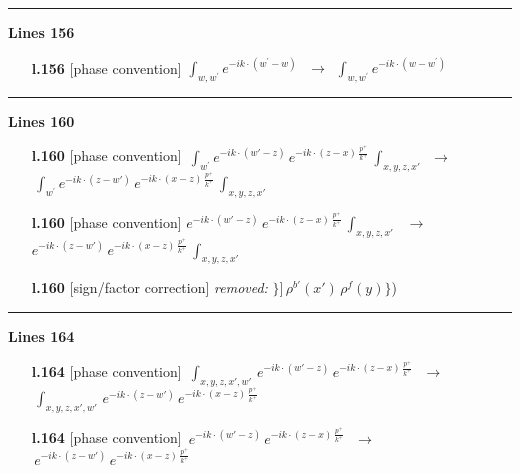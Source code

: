 \documentclass[10pt]{article}
\begin{document}
\noindent\rule{\linewidth}{0.3pt}\par\noindent\textbf{Lines 156} \par
\begin{itemize}[leftmargin=2.2em,itemsep=1pt,topsep=2pt]
\item[\textbf{l.156}] \textsf{\small [phase convention]} $\displaystyle \int_{w, w^\prime} e^{-ik\cdot(w^\prime-w)}\,$\ $\longrightarrow$\ $\displaystyle \int_{w, w^\prime} e^{-ik\cdot(w-w^\prime)}\,$
\end{itemize}
\noindent\rule{\linewidth}{0.3pt}\par\noindent\textbf{Lines 160} \par
\begin{itemize}[leftmargin=2.2em,itemsep=1pt,topsep=2pt]
\item[\textbf{l.160}] \textsf{\small [phase convention]} $\displaystyle \,\int_{ w^\prime} e^{-ik\cdot(w'-z)}\,e^{-ik\cdot (z-x)\,\frac{p^{+}}{k^{+}}}\, \int_{x,y,z,x'}$\ $\longrightarrow$\ $\displaystyle \,\int_{ w^\prime} e^{-ik\cdot(z-w')}\,e^{-ik\cdot (x-z)\,\frac{p^{+}}{k^{+}}}\, \int_{x,y,z,x'}$
\item[\textbf{l.160}] \textsf{\small [phase convention]} $\displaystyle e^{-ik\cdot(w'-z)}\,e^{-ik\cdot (z-x)\,\frac{p^{+}}{k^{+}}}\, \int_{x,y,z,x'}\,$\ $\longrightarrow$\ $\displaystyle e^{-ik\cdot(z-w')}\,e^{-ik\cdot (x-z)\,\frac{p^{+}}{k^{+}}}\, \int_{x,y,z,x'}\,$
\item[\textbf{l.160}] \textsf{\small [sign/factor correction]} \emph{removed:} $\displaystyle \Bigg\}$$\displaystyle ]\,\rho^{b'}(x')\,\rho^{f}(y)\Bigg\}${\color{gray}\small)}
\end{itemize}
\noindent\rule{\linewidth}{0.3pt}\par\noindent\textbf{Lines 164} \par
\begin{itemize}[leftmargin=2.2em,itemsep=1pt,topsep=2pt]
\item[\textbf{l.164}] \textsf{\small [phase convention]} $\displaystyle \,\int_{x,y,z,x',w'}\,e^{-ik\cdot(w'-z)}\,e^{-ik\cdot (z-x)\,\frac{p^{+}}{k^{+}}}\,$\ $\longrightarrow$\ $\displaystyle \,\int_{x,y,z,x',w'}\,e^{-ik\cdot(z-w')}\,e^{-ik\cdot (x-z)\,\frac{p^{+}}{k^{+}}}\,$
\item[\textbf{l.164}] \textsf{\small [phase convention]} $\displaystyle \,e^{-ik\cdot(w'-z)}\,e^{-ik\cdot (z-x)\,\frac{p^{+}}{k^{+}}}\,$\ $\longrightarrow$\ $\displaystyle \,e^{-ik\cdot(z-w')}\,e^{-ik\cdot (x-z)\,\frac{p^{+}}{k^{+}}}\,$
\end{itemize}
\end{document}
